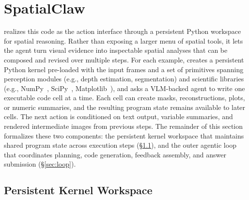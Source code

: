 \section{SpatialClaw}
\label{sec:method}

\ours{} realizes this code as the action interface through a persistent Python workspace for spatial reasoning.
Rather than exposing a larger menu of spatial tools, it lets the agent turn visual evidence into inspectable spatial analyses that can be composed and revised over multiple steps.
For each example, \ours{} creates a persistent Python kernel pre-loaded with the input frames and a set of primitives spanning perception modules (e.g., depth estimation, segmentation) and scientific libraries (e.g., NumPy~\citep{harris2020array}, SciPy~\citep{2020SciPy-NMeth}, Matplotlib~\citep{Hunter:2007}), and asks a VLM-backed agent to write one executable code cell at a time.
Each cell can create masks, reconstructions, plots, or numeric summaries, and the resulting program state remains available to later cells.
The next action is conditioned on text output, variable summaries, and rendered intermediate images from previous steps.
The remainder of this section formalizes these two components: the persistent kernel workspace that maintains shared program state across execution steps (\S\ref{sec:workspace}), and the outer agentic loop that coordinates planning, code generation, feedback assembly, and answer submission (\S\ref{sec:loop}).



\subsection{Persistent Kernel Workspace}
\label{sec:workspace}

